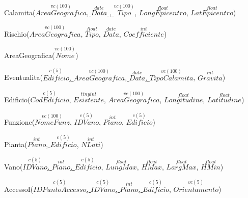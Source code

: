 \documentclass[12pt,a4paper]{report}
\begin{document}
    \vspace{0.5cm}
    \begin{flushleft}
        \begin{footnotesize}
            Calamita(\underline{$\overset{vc(100)}{AreaGeografica}$, $\overset{date}{Data}$ , $\overset{vc(100)}{Tipo}$}, $\overset{float}{LongEpicentro}$, $\overset{float}{LatEpicentro}$)
            \vspace{0.5cm}
    
            Rischio(\underline{$\overset{vc(100)}{AreaGeografica}$}, $\overset{float}{Tipo}$, $\overset{date}{Data}$, $\overset{int}{Coefficiente}$)
            \vspace{0.5cm}
            
            AreaGeografica(\underline{$\overset{vc(100)}{Nome}$})
            \vspace{0.5cm}
            
            Eventualita(\underline{$\overset{c(5)}{Edificio}$, $\overset{vc(100)}{AreaGeografica}$, $\overset{date}{Data}$, $\overset{vc(100)}{TipoCalamita}$}, $\overset{int}{Gravita}$)
            \vspace{0.5cm}
            
            Edificio(\underline{$\overset{c(5)}{CodEdificio}$}, $\overset{tinyint}{Esistente}$, $\overset{vc(100)}{AreaGeografica}$, $\overset{float}{Longitudine}$, $\overset{float}{Latitudine}$)
            \vspace{0.5cm}
            
            Funzione(\underline{$\overset{vc(100)}{NomeFunz}$}, $\overset{c(5)}{IDVano}$, $\overset{int}{Piano}$, $\overset{c(5)}{Edificio}$)
            \vspace{0.5cm}
            
            Pianta(\underline{$\overset{int}{Piano}$, $\overset{c(5)}{Edificio}$}, $\overset{int}{NLati}$)
            \vspace{0.5cm}
            
            Vano(\underline{$\overset{c(5)}{IDVano}$, $\overset{int}{Piano}$, $\overset{c(5)}{Edificio}$}, $\overset{float}{LungMax}$, $\overset{float}{HMax}$, $\overset{float}{LargMax}$, $\overset{float}{HMin}$)
            \vspace{0.5cm}
            
            AccessoI(\underline{$\overset{c(5)}{IDPuntoAccesso}$, $\overset{c(5)}{IDVano}$, $\overset{int}{Piano}$, $\overset{c(5)}{Edificio}$}, $\overset{vc(5)}{Orientamento}$)
            \vspace{0.5cm}
            

\end{footnotesize}
\end{flushleft}
\end{document}
